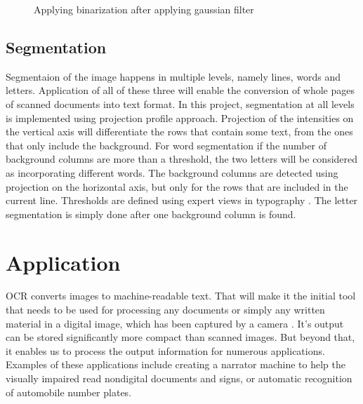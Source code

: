 \documentclass[9pt,twocolumn,twoside]{../../styles/osajnl}
\begin{document}
\begin{figure}[H]
\centering
{}
\caption{Applying binarization after applying gaussian filter}
\end{figure}

\subsection{ Segmentation}
Segmentaion of the image happens in multiple levels, namely lines, words 
and letters. Application of all of these three will enable the conversion
of whole pages of scanned documents into text format.
In this project, segmentation at all levels is implemented using 
projection profile approach. Projection of the intensities on the vertical
axis will differentiate the rows that contain some text, from the ones that
only include the background.
\newline
For word segmentation if the number of background columns are more than a 
threshold, the two letters will be considered as incorporating different words.
The background columns are detected using projection on the horizontal axis, but only
for the rows that are included in the current line. Thresholds are defined using
expert views in typography \cite{dowding1995finer}.
\newline
The letter segmentation is simply done after one background column is found.

\section{Application}

OCR converts images to machine-readable text. That will make it the
initial tool that needs to be used for processing any documents or
simply any written material in a digital image, which has been
captured by a camera \cite{www-ocr-wiki}. It’s output can be stored significantly more
compact than scanned images. But beyond that, it enables us to process
the output information for numerous applications. Examples of these
applications include creating a narrator machine to help the visually
impaired read nondigital documents and signs, or automatic recognition
of automobile number plates.
\end{document}
